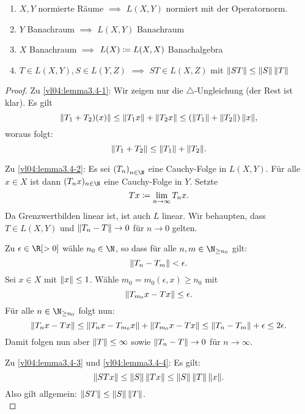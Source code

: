 \begin{thLemma}\hfill
    \begin{enumerate}[(1)]
        \item \label{vl04:lemma3.4-1}
            $X,Y$ normierte Räume $\implies$ $L(X,Y)$ normiert mit der
            Operatornorm.
        \item \label{vl04:lemma3.4-2}
            $Y$ Banachraum $\implies$ $L(X,Y)$ Banachraum
        \item \label{vl04:lemma3.4-3}
            $X$ Banachraum $\implies$ $L(X) \coloneqq L(X,X)$ Banachalgebra
        \item \label{vl04:lemma3.4-4}
            $T\in L(X,Y), S\in L(Y,Z)$ $\implies$ $ST\in L(X,Z)$ mit
            $\lVert ST\rVert\leq\lVert S\rVert\,\lVert T\rVert$
    \end{enumerate}
\end{thLemma}

\begin{proof}
    Zu \ref{vl04:lemma3.4-1}: Wir zeigen nur die $\triangle$-Ungleichung (der
    Rest ist klar). Es gilt
    \[ \lVert T_1+T_2)(x)\rVert \leq \lVert T_1x\rVert + \lVert T_2x\rVert
        \leq (\lVert T_1\rVert+\lVert T_2\rVert) \, \lVert x\rVert
    , \]
    woraus folgt:
    \[ \lVert T_1+T_2\rVert \leq \lVert T_1\rVert + \lVert T_2\rVert  . \]
    
    Zu \ref{vl04:lemma3.4-2}: Es sei $\nSeq T$ eine Cauchy-Folge in $L(X,Y)$.
    Für alle $x\in X$ ist dann $(T_n x)_{n\in\N}$ eine Cauchy-Folge in $Y$.
    Setzte
    \[ Tx \coloneqq \lim_{n\to\infty} T_n x  . \]
    Da Grenzwertbilden linear ist, ist auch $L$ linear. Wir behaupten, dass
    $T\in L(X,Y)$ und $\lVert T_n-T\rVert\to0$ für $n\to0$ gelten.
    
    Zu $\epsilon\in\R[>0]$ wähle $n_0\in\N$, so dass für alle 
    $n,m\in\N_{\geq n_0}$ gilt:
    \[ \lVert T_n-T_m\rVert < \epsilon  .\]
    Sei $x\in X$ mit $\lVert x\rVert\leq 1$. Wähle $m_0=m_0(\epsilon,x) \geq n_0$ mit
    \[ \lVert T_{m_0} x - Tx\rVert \leq \epsilon . \]
    Für alle $n\in\N_{\geq n_0}$ folgt nun:
    \[ \lVert T_n x -Tx\rVert \leq \lVert T_n x - T_{m_0} x\rVert + \lVert T_{m_0} x - T x\rVert
        \leq \lVert T_n-T_m\rVert + \epsilon \leq 2\epsilon
    . \]
    Damit folgen nun aber $\lVert T\rVert \leq \infty$ sowie $\lVert T_n-T\rVert\to0$ für
    $n\to\infty$.
    
    Zu \ref{vl04:lemma3.4-3} und \ref{vl04:lemma3.4-4}: Es gilt:
    \[ \lVert STx\rVert \leq \lVert S\rVert \, \lVert Tx\rVert \leq \lVert S\rVert\,\lVert T\rVert\,\lVert x\rVert
    . \]
    Also gilt allgemein: $\lVert ST\rVert \leq \lVert S\rVert\,\lVert T\rVert$.
    \\
\end{proof}

